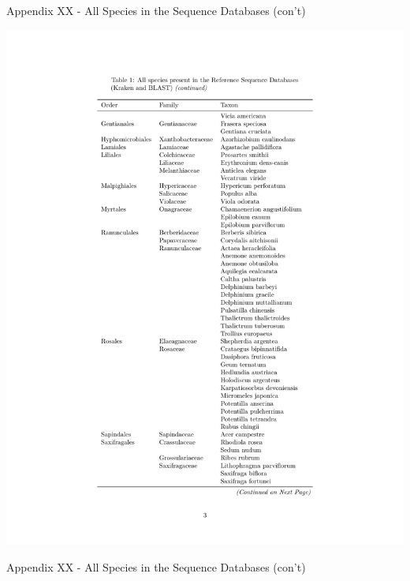 \documentclass[
]{article}
\begin{document}
\newpage

Appendix XX - All Species in the Sequence Databases (con't)

\includegraphics{../graphics/assorted/kraken_db_spp_table-3.pdf}

\newpage

Appendix XX - All Species in the Sequence Databases (con't)
\end{document}
